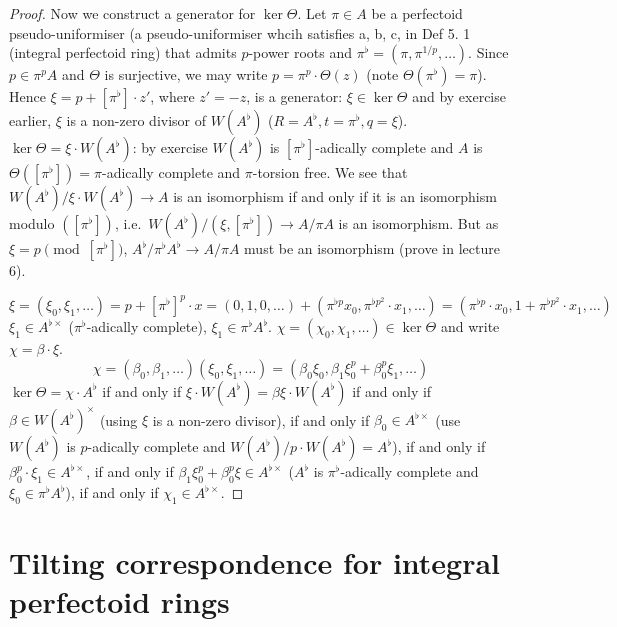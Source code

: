 \documentclass[a4paper]{article}
\newcommand{\tilt}{\flat} %
\begin{document}
\begin{proof}
  Now we construct a generator for \(\ker \Theta\). Let \(\pi \in A\) be a perfectoid pseudo-uniformiser (a pseudo-uniformiser whcih satisfies a, b, c, in Def 5. 1 (integral perfectoid ring) that admits \(p\)-power roots and \(\pi^\tilt = (\pi, \pi^{1/p}, \dots)\). Since \(p \in \pi^pA\) and \(\Theta\) is surjective, we may write \(p = \pi^p \cdot \Theta(z)\) (note \(\Theta(\pi^\tilt) = \pi\)). Hence \(\xi = p + [\pi^\tilt] \cdot z'\), where \(z' = -z\), is a generator: \(\xi \in \ker \Theta\) and by exercise earlier, \(\xi\) is a non-zero divisor of \(W(A^\tilt)\) (\(R = A^\tilt, t = \pi^\tilt, q = \xi\)). \(\ker \Theta = \xi \cdot W(A^\tilt)\): by exercise \(W(A^\tilt)\) is \([\pi^\tilt]\)-adically complete and \(A\) is \(\Theta([\pi^\tilt]) = \pi\)-adically complete and \(\pi\)-torsion free. We see that \(W(A^\tilt)/\xi \cdot W(A^\tilt) \to A\) is an isomorphism if and only if it is an isomorphism modulo \(([\pi^\tilt])\), i.e.\ \(W(A^\tilt)/(\xi, [\pi^\tilt]) \to A/\pi A\) is an isomorphism. But as \(\xi = p \pmod{[\pi^\tilt]}\), \(A^\tilt/\pi^\tilt A^\tilt \to A/\pi A\) must be an isomorphism (prove in lecture 6).
\item
  \[
    \xi
    = (\xi_0, \xi_1, \dots)
    = p + [\pi^\tilt]^p \cdot x = (0, 1, 0, \dots) + (\pi^{\tilt p} x_0, \pi^{\tilt p^2} \cdot x_1, \dots)
    = (\pi^{\tilt p} \cdot x_0, 1 + \pi^{\tilt p^2} \cdot x_1, \dots)
  \]
  \(\xi_1 \in A^{\tilt \times}\) (\(\pi^\tilt\)-adically complete), \(\xi_1 \in \pi^\tilt A^\tilt\). \(\chi = (\chi_0, \chi_1, \dots) \in \ker \Theta\) and write \(\chi = \beta \cdot \xi\).
  \[
    \chi = (\beta_0, \beta_1, \dots) (\xi_0, \xi_1, \dots) = (\beta_0 \xi_0, \beta_1 \xi_0^p + \beta_0^p \xi_1, \dots)
  \]
  \(\ker \Theta = \chi \cdot A^\tilt\) if and only if \(\xi \cdot W(A^\tilt) = \beta \xi \cdot W(A^\tilt)\) if and only if \(\beta \in W(A^\tilt)^\times\) (using \(\xi\) is a non-zero divisor), if and only if \(\beta_0 \in A^{\tilt \times}\) (use \(W(A^\tilt)\) is \(p\)-adically complete and \(W(A^\tilt)/p \cdot W(A^\tilt) = A^\tilt\)), if and only if \(\beta_0^p \cdot \xi_1 \in A^{\tilt \times}\), if and only if \(\beta_1 \xi_0^p + \beta_0^p \xi \in A^{\tilt \times}\) (\(A^\tilt\) is \(\pi^\tilt\)-adically complete and \(\xi_0 \in \pi^\tilt A^\tilt\)), if and only if \(\chi_1 \in A^{\tilt \times}\).
\end{proof}

\section{Tilting correspondence for integral perfectoid rings}
\end{document}

